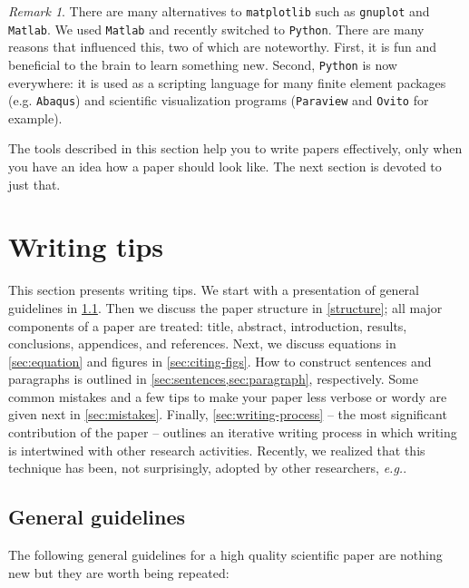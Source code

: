 \documentclass[authoryear,12pta4paper,fleqn]{article}
\newcommand{\eg}{\textit{e.g.}\xspace}
\numberwithin{equation}{section}
\theoremstyle{remark}
\newtheorem{rmk}{Remark}
\begin{document}
\begin{rmk}\label{rm:a}
There are many alternatives to \texttt{matplotlib} such as \texttt{gnuplot} and \texttt{Matlab}. We used  \texttt{Matlab} and recently switched to \texttt{Python}. There are many reasons that influenced this, two of which are noteworthy. First, it is fun and beneficial to the brain to learn something new. Second, \texttt{Python} is now everywhere: it is used as a scripting language for many finite element packages (e.g. \texttt{Abaqus}) and scientific visualization programs (\texttt{Paraview} and \texttt{Ovito} for example).
\end{rmk}


The tools described in this section help you to write papers effectively, only when you have an idea how a paper should look like. The next section is devoted to just that. 

\section{Writing tips}\label{sec:writing-tips}

This section presents  writing tips. We start with a presentation of general guidelines in \cref{sec:guidelines}. Then we  discuss the paper structure in \cref{structure};  all major components of a paper are treated: title, abstract, introduction, results, conclusions, appendices, and references. Next, we discuss equations in
\cref{sec:equation} and figures in \cref{sec:citing-figs}. How to construct sentences and paragraphs is outlined in \cref{sec:sentences,sec:paragraph}, respectively.
Some common mistakes and a few tips to make your paper less verbose or wordy are given next in 
\cref{sec:mistakes}.  Finally, \cref{sec:writing-process} -- the most significant contribution of the paper -- outlines an iterative writing process in which writing is intertwined with other research activities. Recently, we realized that this technique has been, not surprisingly, adopted by other researchers, \eg \cite{Jones}.

\subsection{General guidelines}\label{sec:guidelines}

The following general guidelines for a high quality scientific paper are nothing new but they are worth being repeated:
\end{document}
